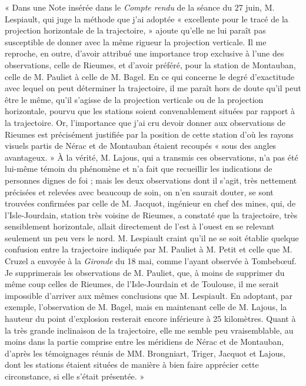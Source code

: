 \documentclass[a4paper, 11pt, oneside, polutonikogreek, french]{article}
\begin{document}
« Dans une Note insérée dans le \emph{Compte rendu} de la séance du 27 juin, M. Lespiault, qui juge la méthode que j'ai adoptée « excellente pour le tracé de la projection horizontale de la trajectoire, » ajoute qu'elle ne lui paraît pas susceptible de donner avec la même rigueur la projection verticale. Il me reproche, en outre, d'avoir attribué une importance trop exclusive à l'une des observations, celle de Rieumes, et d'avoir préféré, pour la station de Montauban, celle de M. Pauliet à celle de M. Bagel. En ce qui concerne le degré d'exactitude avec lequel on peut déterminer la trajectoire, il me paraît hors de doute qu'il peut être le même, qu'il s'agisse de la projection verticale ou de la projection horizontale, pourvu que les stations soient convenablement situées par rapport à la trajectoire. Or, l'importance que j'ai cru devoir donner aux observations de Rieumes est précisément justifiée par la position de cette station d'où les rayons visuels partis de Nérac et de Montauban étaient recoupés « sous des angles avantageux. » À la vérité, M. Lajous, qui a transmis ces observations, n'a pas été lui-même témoin du phénomène et n'a fait que recueillir les indications de personnes dignes de foi ; mais les deux observations dont il s'agit, très nettement précisées et relevées avec beaucoup de soin, on n'en saurait douter, se sont trouvées confirmées par celle de M. Jacquot, ingénieur en chef des mines, qui, de l'Isle-Jourdain, station très voisine de Rieumes, a constaté que la trajectoire, très sensiblement horizontale, allait directement de l'est à l'ouest en se relevant seulement un peu vers le nord. M. Lespiault craint qu'il ne se soit établie quelque confusion entre la trajectoire indiquée par M. Pauliet à M. Petit et celle que M. Cruzel a envoyée à la \emph{Gironde} du 18 mai, comme l'ayant observée à Tombebœuf. Je supprimerais les observations de M. Pauliet, que, à moins de supprimer du même coup celles de Rieumes, de l'Isle-Jourdain et de Toulouse, il me serait impossible d'arriver aux mêmes conclusions que M. Lespiault. En adoptant, par exemple, l'observation de M. Bagel, mais en maintenant celle de M. Lajous, la hauteur du point d'explosion resterait encore inférieure à 25 kilomètres. Quant à la très grande inclinaison de la trajectoire, elle me semble peu vraisemblable, au moins dans la partie comprise entre les méridiens de Nérac et de Montauban, d'après les témoignages réunis de MM. Brongniart, Triger, Jacquot et Lajous, dont les stations étaient situées de manière à bien faire apprécier cette circonstance, si elle s'était présentée. »
\end{document}
